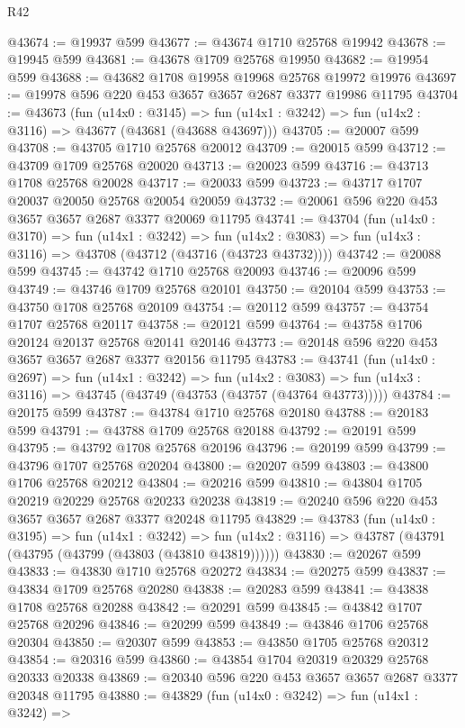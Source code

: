 \begin{lexlean}{R42}
\begin{coremodule}
@43674 := @19937 @599
@43677 := @43674 @1710 @25768 @19942
@43678 := @19945 @599
@43681 := @43678 @1709 @25768 @19950
@43682 := @19954 @599
@43688 := @43682 @1708 @19958 @19968 @25768 @19972 @19976
@43697 := @19978 @596 @220 @453 @3657 @3657 @2687 @3377 @19986 @11795
@43704 := @43673
    (fun (u14x0 : @3145) =>
    fun (u14x1 : @3242) => fun (u14x2 : @3116) => @43677 (@43681 (@43688 @43697)))
@43705 := @20007 @599
@43708 := @43705 @1710 @25768 @20012
@43709 := @20015 @599
@43712 := @43709 @1709 @25768 @20020
@43713 := @20023 @599
@43716 := @43713 @1708 @25768 @20028
@43717 := @20033 @599
@43723 := @43717 @1707 @20037 @20050 @25768 @20054 @20059
@43732 := @20061 @596 @220 @453 @3657 @3657 @2687 @3377 @20069 @11795
@43741 := @43704
    (fun (u14x0 : @3170) =>
    fun (u14x1 : @3242) =>
    fun (u14x2 : @3083) => fun (u14x3 : @3116) => @43708 (@43712 (@43716 (@43723 @43732))))
@43742 := @20088 @599
@43745 := @43742 @1710 @25768 @20093
@43746 := @20096 @599
@43749 := @43746 @1709 @25768 @20101
@43750 := @20104 @599
@43753 := @43750 @1708 @25768 @20109
@43754 := @20112 @599
@43757 := @43754 @1707 @25768 @20117
@43758 := @20121 @599
@43764 := @43758 @1706 @20124 @20137 @25768 @20141 @20146
@43773 := @20148 @596 @220 @453 @3657 @3657 @2687 @3377 @20156 @11795
@43783 := @43741
    (fun (u14x0 : @2697) =>
    fun (u14x1 : @3242) =>
    fun (u14x2 : @3083) => fun (u14x3 : @3116) => @43745 (@43749 (@43753 (@43757 (@43764 @43773)))))
@43784 := @20175 @599
@43787 := @43784 @1710 @25768 @20180
@43788 := @20183 @599
@43791 := @43788 @1709 @25768 @20188
@43792 := @20191 @599
@43795 := @43792 @1708 @25768 @20196
@43796 := @20199 @599
@43799 := @43796 @1707 @25768 @20204
@43800 := @20207 @599
@43803 := @43800 @1706 @25768 @20212
@43804 := @20216 @599
@43810 := @43804 @1705 @20219 @20229 @25768 @20233 @20238
@43819 := @20240 @596 @220 @453 @3657 @3657 @2687 @3377 @20248 @11795
@43829 := @43783
    (fun (u14x0 : @3195) =>
    fun (u14x1 : @3242) =>
    fun (u14x2 : @3116) => @43787 (@43791 (@43795 (@43799 (@43803 (@43810 @43819))))))
@43830 := @20267 @599
@43833 := @43830 @1710 @25768 @20272
@43834 := @20275 @599
@43837 := @43834 @1709 @25768 @20280
@43838 := @20283 @599
@43841 := @43838 @1708 @25768 @20288
@43842 := @20291 @599
@43845 := @43842 @1707 @25768 @20296
@43846 := @20299 @599
@43849 := @43846 @1706 @25768 @20304
@43850 := @20307 @599
@43853 := @43850 @1705 @25768 @20312
@43854 := @20316 @599
@43860 := @43854 @1704 @20319 @20329 @25768 @20333 @20338
@43869 := @20340 @596 @220 @453 @3657 @3657 @2687 @3377 @20348 @11795
@43880 := @43829
    (fun (u14x0 : @3242) =>
    fun (u14x1 : @3242) =>

\end{coremodule}
\end{lexlean}
